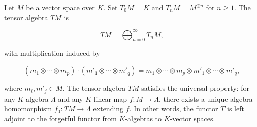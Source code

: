 Let $M$ be a vector space over $K$. Set $T_0 M = K$ and $T_n M = M^{\otimes n}$ for $n \geq 1$. The tensor algebra $TM$ is

$$TM = \bigoplus_{n=0}^{\infty} T_n M,$$

with multiplication induced by

$$(m_1 \otimes \cdots \otimes m_p) \cdot (m'_1 \otimes \cdots \otimes m'_q) = m_1 \otimes \cdots \otimes m_p \otimes m'_1 \otimes \cdots \otimes m'_q,$$

where $m_i, m'_j \in M$. The tensor algebra $TM$ satisfies the universal property: for any $K$-algebra $\Lambda$ and any $K$-linear map $f: M \to \Lambda$, there exists a unique algebra homomorphism $f_0: TM \to \Lambda$ extending $f$. In other words, the functor $T$ is left adjoint to the forgetful functor from $K$-algebras to $K$-vector spaces.
